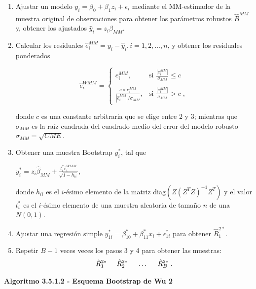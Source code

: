 \begin{enumerate}
	\item  Ajustar un modelo $y_{i} = \beta_{0} +\beta_{1}z_{i} + \epsilon_{i}$  mediante el MM-estimador de la muestra original de observaciones para obtener los parámetros robustos $\hat{B}^{MM}$ y, obtener los ajustados $\hat{y}_{i}=z_{i}\hat{\beta}_{MM}$.
	
	\item  Calcular los residuales $ \hat{e}^{MM}_{i} = y_{i}-\hat{y}_{i},i = 1,2, \dots, n$, y obtener los residuales ponderados
	\begin{center}
	{\large\[
	\hat{e}^{WMM}_{i} =
	\begin{cases}
		e^{MM}_{i}, & \text{si } \frac{|e^{MM}_{i}|}{\sigma_{MM}} \leq c \\ \\
		\frac{c \times e^{MM}_{i}}{ | \hat{e}^{MM}_{i} | /\sigma_{MM}},     & \text{si } \frac{|e^{MM}_{i}|}{\sigma_{MM}} > c \; ,
	\end{cases}
	\]}
	\end{center} 
	donde $c$ es una constante arbitraria que se elige entre 2 y 3; mientras que $\sigma_{MM}$ es la
	raíz cuadrada del cuadrado medio del error del modelo robusto $\sigma_{MM} = \sqrt{CME}$.

	\item Obtener una muestra Bootstrap $y^{*}_{i}$, tal que 
	\begin{center}
		{\large$y^{*}_{i} =z_{i}\hat{\beta}_{MM} + \frac{t^{*}_{i}\hat{e}^{WMM}_{i}}{\sqrt{1-h_{ii}}} $},
	\end{center}
	donde $h_{ii}$ es el $i$-ésimo elemento de la matriz diag$(Z(Z^{T}Z)^{-1} Z^{T})$ y el valor $t^{*}_{i}$ es el
	$i$-ésimo elemento de una muestra aleatoria de tamaño $n$ de una $N(0,1)$.
	
	\item  Ajustar una regresión simple $ y^{*}_{1i} = \beta^{*}_{10} +\beta^{*}_{11}x_{i} + \epsilon^{*}_{1i} $ para obtener $ \hat{R}^{2*}_{1} $.
	
		\item Repetir $B - 1$ veces veces los pasos 3 y 4 para obtener las muestras:
	\[
	\hat{R}^{2*}_{1} \hspace{.5cm} \hat{R}^{2*}_{2} \hspace{.5cm} \dots \hspace{.5cm} \hat{R}^{2*}_{B} \; .
	\]
\end{enumerate}


\textbf{Algoritmo 3.5.1.2 - Esquema Bootstrap de Wu 2}


